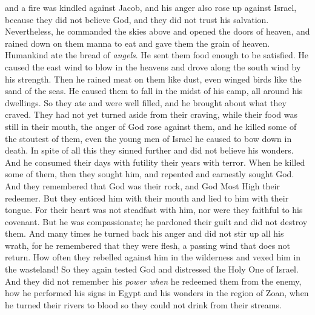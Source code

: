 \begin{biblechapter}
and a fire was kindled against Jacob, 
and his anger also rose up against Israel,
\verse because they did not believe God, 
and they did not trust his salvation.
\verse Nevertheless, he commanded the skies above 
and opened the doors of heaven,
\verse and rained down on them manna to eat 
and gave them the grain of heaven.
\verse Humankind ate the bread of \textit{angels}. 
He sent them food enough to be satisfied.
\verse He caused the east wind to blow in the heavens 
and drove along the south wind by his strength.
\verse Then he rained meat on them like dust, 
even winged birds like the sand of the seas.
\verse He caused them to fall in the midst of his camp, 
all around his dwellings.
\verse So they ate and were well filled, 
and he brought about what they craved.
\verse They had not yet turned aside from their craving, 
while their food was still in their mouth,
\verse the anger of God rose against them, 
and he killed some of the stoutest of them, 
even the young men of Israel he caused to bow down in death.
\verse In spite of all this they sinned further 
and did not believe his wonders.
\verse And he consumed their days with futility  
their years with terror.
\verse When he killed some of them, then they sought him, 
and repented and earnestly sought God.
\verse And they remembered that God was their rock, 
and God Most High their redeemer.
\verse But they enticed him with their mouth 
and lied to him with their tongue.
\verse For their heart was not steadfast with him, 
nor were they faithful to his covenant.
\verse But he was compassionate; he pardoned their guilt 
and did not destroy them. 
And many times he turned back his anger 
and did not stir up all his wrath,
\verse for he remembered that they were flesh, 
a passing wind that does not return.
\verse How often they rebelled against him in the wilderness 
and vexed him in the wasteland!
\verse So they again tested God 
and distressed the Holy One of Israel.
\verse And they did not remember his \textit{power} 
\textit{when} he redeemed them from the enemy,
\verse how he performed his signs in Egypt 
and his wonders in the region of Zoan,
\verse when he turned their rivers to blood 
so they could not drink from their streams.

\end{biblechapter}
